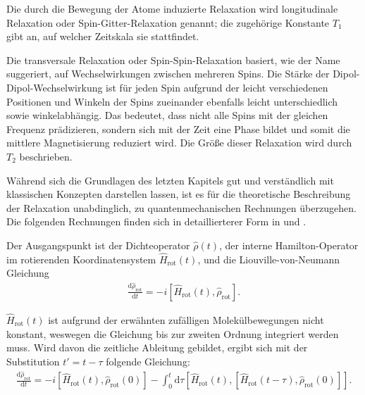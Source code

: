 Die durch die Bewegung der Atome induzierte Relaxation wird longitudinale Relaxation oder Spin-Gitter-Relaxation genannt; die zugehörige Konstante $T_1$ gibt an, auf welcher Zeitskala sie stattfindet.

Die transversale Relaxation oder Spin-Spin-Relaxation basiert, wie der Name suggeriert, auf Wechselwirkungen zwischen mehreren Spins. Die Stärke der Dipol-Dipol-Wechselwirkung ist für jeden Spin aufgrund der leicht verschiedenen Positionen und Winkeln der Spins zueinander ebenfalls leicht unterschiedlich sowie winkelabhängig. Das bedeutet, dass nicht alle Spins mit der gleichen Frequenz prädizieren, sondern sich mit der Zeit eine Phase bildet und somit die mittlere Magnetisierung reduziert wird. Die Größe dieser Relaxation wird durch $T_2$ beschrieben.


Während sich die Grundlagen des letzten Kapitels gut und verständlich mit klassischen Konzepten darstellen lassen, ist es für die theoretische Beschreibung der Relaxation unabdinglich, zu quantenmechanischen Rechnungen überzugehen. Die folgenden Rechnungen finden sich in detaillierterer Form in \cite[S. 191-195]{benesi} und \cite[S. 108-110]{spiess}.

Der Ausgangspunkt ist der Dichteoperator $\hat{\rho}(t)$, der interne Hamilton-Operator im rotierenden Koordinatensystem $\hat{H}_\text{rot}(t)$, und die Liouville-von-Neumann Gleichung
\begin{align}
    \frac{\text{d} \hat{\rho}_\text{rot}}{\text{d}t} = -i [\hat{H}_\text{rot}(t), \hat{\rho}_\text{rot}].
\end{align}

$\hat{H}_\text{rot}(t)$ ist aufgrund der erwähnten zufälligen Molekülbewegungen nicht konstant, weswegen die Gleichung bis zur zweiten Ordnung integriert werden muss. Wird davon die zeitliche Ableitung gebildet, ergibt sich mit der Substitution $t' = t - \tau$ folgende Gleichung:
\begin{align}
    \frac{\text{d} \hat{\rho}_\text{rot}}{\text{d}t} = - i [\hat{H}_\text{rot}(t), \hat{\rho}_\text{rot}(0)] - \int_0^t \text{d} \tau \left[\hat{H}_\text{rot}(t), [\hat{H}_\text{rot}(t-\tau), \hat{\rho}_\text{rot}(0)] \right].
\end{align}


